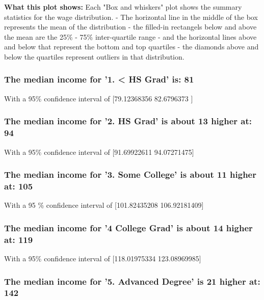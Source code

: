 \documentclass[11pt]{article}
\begin{document}
    \textbf{What this plot shows:} Each "Box and whiskers" plot shows the
summary statistics for the wage distribution. - The horizontal line in
the middle of the box represents the mean of the distribution - the
filled-in rectangels below and above the mean are the 25\% - 75\%
inter-quartile range - and the horizontal lines above and below that
represent the bottom and top quartiles - the diamonds above and below
the quartiles represent outliers in that distribution.

    \subsubsection{The median income for '1. \textless{} HS Grad' is:
81}\label{the-median-income-for-1.-hs-grad-is-81}

With a 95\% confidence interval of {[}79.12368356 82.6796373 {]}

    \subsubsection{The median income for '2. HS Grad' is about 13 higher at:
94}\label{the-median-income-for-2.-hs-grad-is-about-13-higher-at-94}

With a 95\% confidence interval of {[}91.69922611 94.07271475{]}

    \subsubsection{The median income for '3. Some College' is about 11
higher at:
105}\label{the-median-income-for-3.-some-college-is-about-11-higher-at-105}

With a 95 \% confidence interval of {[}101.82435208 106.92181409{]}

    \subsubsection{The median income for '4 College Grad' is about 14 higher
at:
119}\label{the-median-income-for-4-college-grad-is-about-14-higher-at-119}

With a 95\% confidence interval of {[}118.01975334 123.08969985{]}

    \subsubsection{The median income for '5. Advanced Degree' is 21 higher
at:
142}\label{the-median-income-for-5.-advanced-degree-is-21-higher-at-142}
\end{document}
